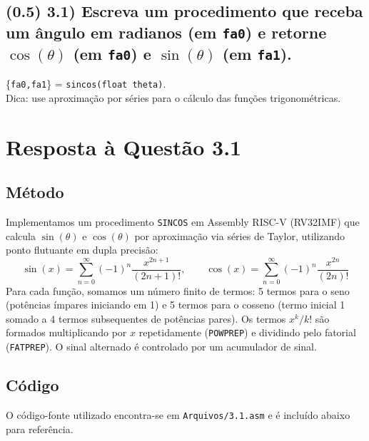 \documentclass[12pt,a4paper]{article}
\begin{document}
\subsection*{(0.5) 3.1) Escreva um procedimento que receba um ângulo em radianos (em \texttt{fa0}) e retorne $\cos(\theta)$ (em \texttt{fa0}) e $\sin(\theta)$ (em \texttt{fa1}).}
\{\texttt{fa0,fa1}\} = \texttt{sincos(float theta)}. \\
Dica: use aproximação por séries para o cálculo das funções trigonométricas.

\section*{Resposta à Questão 3.1}

\subsection*{Método}
Implementamos um procedimento \texttt{SINCOS} em Assembly RISC-V (RV32IMF) que calcula $\sin(\theta)$ e $\cos(\theta)$ por aproximação via séries de Taylor, utilizando ponto flutuante em dupla precisão:
\[
\sin(x) = \sum_{n=0}^{\infty} (-1)^n \frac{x^{2n+1}}{(2n+1)!},\qquad
\cos(x) = \sum_{n=0}^{\infty} (-1)^n \frac{x^{2n}}{(2n)!}
\]
Para cada função, somamos um número finito de termos: 5 termos para o seno (potências ímpares iniciando em 1) e 5 termos para o cosseno (termo inicial 1 somado a 4 termos subsequentes de potências pares). Os termos \(x^k/k!\) são formados multiplicando por \(x\) repetidamente (\texttt{POWPREP}) e dividindo pelo fatorial (\texttt{FATPREP}). O sinal alternado é controlado por um acumulador de sinal.

\subsection*{Código}
O código-fonte utilizado encontra-se em \texttt{Arquivos/3.1.asm} e é incluído abaixo para referência.
\end{document}
